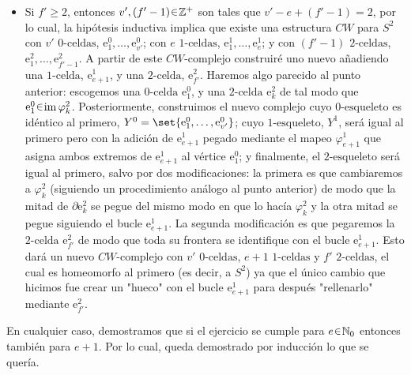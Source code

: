 \begin{sol}
\begin{itemize}
    {\mathsurround = 0pt
    \[\begin{tikzcd}
    	{[0,1]} && {Y^1} \\
    	{\partial\mathrm{e}^2_k}
    	\arrow["{(\varphi^2_k \circ c_1) \cup c_2}", from=1-1, to=1-3]
    	\arrow["p"', two heads, from=1-1, to=2-1]
    	\arrow["{\psi^2_k}"', dashed, from=2-1, to=1-3]
    \end{tikzcd}\]
    }
    Finalmente, el $2\text{-esqueleto}$ $Y^2$ se obtiene reemplazando $\varphi^2_k$ por $\psi^2_k$. 
    Este nuevo complejo tiene $v'$ $0\text{-celdas}$, $e+1$ $1\text{-celdas}$ y $f'$ $2\text{-celdas}$; más aún, es homeomorfo al primero (es decir, a $S^2$) gracias a que el único cambio que hicimos fue agregar un "pelo" y adecuar un disco de modo que el pelo quede integrado a la esfera y no por fuera de ella.

    \item Si $f' \geq 2$, entonces $v',(f'-1) \en \mathbb{Z}^+$ son tales que $ v' - e + (f'-1) = 2$, por lo cual, la hipótesis inductiva implica que existe una estructura $CW$ para $S^2$ con $v'$ $0\text{-celdas}$, $\mathrm{e}^0_1,\dots,\mathrm{e}^0_{v'}$; con $e$ $1\text{-celdas}$, $\mathrm{e}^1_1,\dots,\mathrm{e}^1_e$; y con $(f'-1)$ $2\text{-celdas}$, $\mathrm{e}^2_1,\dots,\mathrm{e}^2_{f'-1}$. A partir de este $CW\text{-complejo}$ construiré uno nuevo añadiendo una $1\text{-celda}$, $\mathrm{e}^1_{e+1}$, y una $2\text{-celda}$, $\mathrm{e}^2_{f'}$. Haremos algo parecido al punto anterior: escogemos una $0\text{-celda}$ $\mathrm{e}^0_1$, y una $2\text{-celda}$ $\mathrm{e}^2_k$ de tal modo que $\mathrm{e}^0_1 \en \im\varphi^2_k$. Posteriormente, construimos el nuevo complejo cuyo $0\text{-esqueleto}$ es idéntico al primero, $Y^0 = \set{\mathrm{e}^0_1,\dots,\mathrm{e}^0_{v'}}$; cuyo $1\text{-esqueleto}$, $Y^1$, será igual al primero pero con la adición de $\mathrm{e}^1_{e+1}$ pegado mediante el mapeo $\varphi^1_{e+1}$ que asigna ambos extremos de $\mathrm{e}^1_{e+1}$ al vértice $\mathrm{e}^0_1$; y finalmente, el $2\text{-esqueleto}$ será igual al primero, salvo por dos modificaciones: la primera es que cambiaremos a $\varphi^2_k$ (siguiendo un procedimiento análogo al punto anterior) de modo que la mitad de $\partial\mathrm{e}^2_k$ se pegue del mismo modo en que lo hacía $\varphi^2_k$ y la otra mitad se pegue siguiendo el bucle $\mathrm{e}^1_{e+1}$. La segunda modificación es que pegaremos la $2\text{-celda}$ $\mathrm{e}^2_{f'}$ de modo que toda su frontera se identifique con el bucle $\mathrm{e}^1_{e+1}$. Esto dará un nuevo $CW\text{-complejo}$ con $v'$ $0\text{-celdas}$, $e+1$ $1\text{-celdas}$ y $f'$ $2\text{-celdas}$, el cual es homeomorfo al primero (es decir, a $S^2$) ya que el único cambio que hicimos fue crear un "hueco" con el bucle $\mathrm{e}^1_{e+1}$ para después "rellenarlo" mediante $\mathrm{e}^2_{f'}$.
\end{itemize}
En cualquier caso, demostramos que si el ejercicio se cumple para $e \en \mathbb{N}_0$ entonces también para $e+1$. Por lo cual, queda demostrado por inducción lo que se quería.
\end{sol}

